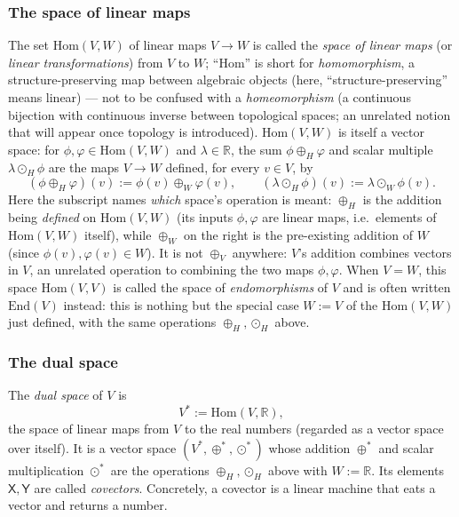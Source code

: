 \documentclass[11pt]{article}
\newcommand{\dual}{V^{*}}
\begin{document}
\subsubsection*{The space of linear maps}
The set $\mathrm{Hom}(V,W)$ of linear maps $V\to W$ is called the \emph{space of linear maps} (or \emph{linear transformations}) from $V$ to $W$; ``$\mathrm{Hom}$'' is short for \emph{homomorphism}, a structure-preserving map between algebraic objects (here, ``structure-preserving'' means linear) --- not to be confused with a \emph{homeomorphism} (a continuous bijection with continuous inverse between topological spaces; an unrelated notion that will appear once topology is introduced). $\mathrm{Hom}(V,W)$ is itself a vector space: for $\phi,\varphi\in\mathrm{Hom}(V,W)$ and $\lambda\in\mathbb R$, the sum $\phi\oplus_H\varphi$ and scalar multiple $\lambda\odot_H\phi$ are the maps $V\to W$ defined, for every $v\in V$, by
\[
(\phi\oplus_H\varphi)(v):=\phi(v)\oplus_W\varphi(v), \qquad (\lambda\odot_H\phi)(v):=\lambda\odot_W\phi(v).
\]
Here the subscript names \emph{which} space's operation is meant: $\oplus_H$ is the addition being \emph{defined} on $\mathrm{Hom}(V,W)$ (its inputs $\phi,\varphi$ are linear maps, i.e.\ elements of $\mathrm{Hom}(V,W)$ itself), while $\oplus_W$ on the right is the pre-existing addition of $W$ (since $\phi(v),\varphi(v)\in W$). It is not $\oplus_V$ anywhere: $V$'s addition combines vectors in $V$, an unrelated operation to combining the two maps $\phi,\varphi$. When $V=W$, this space $\mathrm{Hom}(V,V)$ is called the space of \emph{endomorphisms} of $V$ and is often written $\mathrm{End}(V)$ instead: this is nothing but the special case $W:=V$ of the $\mathrm{Hom}(V,W)$ just defined, with the same operations $\oplus_H,\odot_H$ above.

\subsubsection*{The dual space}
The \emph{dual space} of $V$ is
\[
\dual:=\mathrm{Hom}(V,\mathbb R),
\]
the space of linear maps from $V$ to the real numbers (regarded as a vector space over itself). It is a vector space $(\dual,\oplus^*,\odot^*)$ whose addition $\oplus^*$ and scalar multiplication $\odot^*$ are the operations $\oplus_H,\odot_H$ above with $W:=\mathbb R$. Its elements $\mathsf X,\mathsf Y$ are called \emph{covectors}. Concretely, a covector is a linear machine that eats a vector and returns a number.
\end{document}
